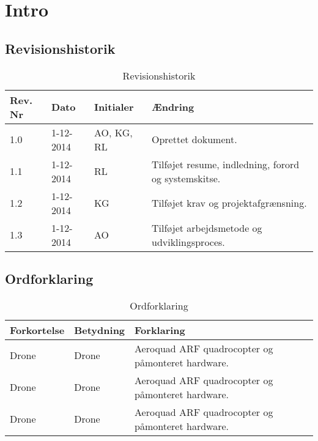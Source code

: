 \chapter{Intro}

\section{Revisionshistorik}
\begin{table}[H]
	\centering
		\begin{tabular}{|p{1.7 cm}|p{2 cm}|p{2.5 cm}|p{6.8 cm}|} 
		\hline
			\textbf{Rev. Nr} & \textbf{Dato}		& \textbf{Initialer} 	& \textbf{Ændring} \\ \hline
			1.0 	& 1-12-2014 & AO, KG, RL  & Oprettet dokument.  \\ \hline
			1.1 	& 1-12-2014 & RL  & Tilføjet resume, indledning, forord og systemskitse. \\ \hline
			1.2 	& 1-12-2014 & KG  & Tilføjet krav og projektafgrænsning. 	\\ \hline
			1.3 	& 1-12-2014 & AO  & Tilføjet arbejdsmetode og \newline udviklingsproces.	\\ \hline

		\end{tabular}
	\caption{Revisionshistorik}
\end{table}


\vspace{1.5cm}

\section{Ordforklaring}
\begin{table}[H]
	\centering
		\begin{tabular}{|p{2.6cm}|p{4.5 cm}|p{6.5 cm}|} 
		\hline
			\textbf{Forkortelse} & \textbf{Betydning} & \textbf{Forklaring} \\ \hline
			 Drone & Drone & Aeroquad ARF quadrocopter og \newline påmonteret hardware. \\ \hline
			 Drone & Drone & Aeroquad ARF quadrocopter og \newline påmonteret hardware. \\ \hline
			 Drone & Drone & Aeroquad ARF quadrocopter og \newline påmonteret hardware. \\ \hline
		\end{tabular}
	\caption{Ordforklaring}
\end{table}

\newpage
